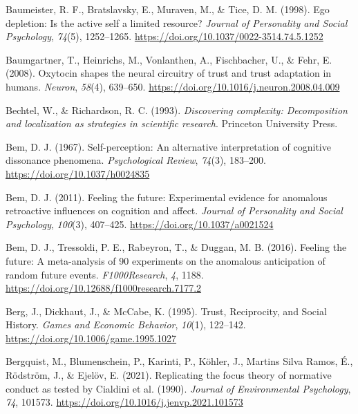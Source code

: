 \documentclass[
  letterpaper,
]{book}
\newlength{\cslhangindent}
\newenvironment{CSLReferences}[2] %
 {\begin{list}{}{%
  \setlength{\itemindent}{0pt}
  \setlength{\leftmargin}{0pt}
  \setlength{\parsep}{0pt}
  \ifodd #1
   \setlength{\leftmargin}{\cslhangindent}
   \setlength{\itemindent}{-1\cslhangindent}
  \fi
  \setlength{\itemsep}{#2\baselineskip}}}
 {\end{list}}
\begin{document}
\begin{CSLReferences}{1}{0}
Baumeister, R. F., Bratslavsky, E., Muraven, M., \& Tice, D. M. (1998).
Ego depletion: Is the active self a limited resource? \emph{Journal of
Personality and Social Psychology}, \emph{74}(5), 1252--1265.
\url{https://doi.org/10.1037/0022-3514.74.5.1252}

Baumgartner, T., Heinrichs, M., Vonlanthen, A., Fischbacher, U., \&
Fehr, E. (2008). Oxytocin shapes the neural circuitry of trust and trust
adaptation in humans. \emph{Neuron}, \emph{58}(4), 639--650.
\url{https://doi.org/10.1016/j.neuron.2008.04.009}

Bechtel, W., \& Richardson, R. C. (1993). \emph{Discovering complexity:
{Decomposition} and localization as strategies in scientific research}.
Princeton University Press.

Bem, D. J. (1967). Self-perception: {An} alternative interpretation of
cognitive dissonance phenomena. \emph{Psychological Review},
\emph{74}(3), 183--200. \url{https://doi.org/10.1037/h0024835}

Bem, D. J. (2011). Feeling the future: {Experimental} evidence for
anomalous retroactive influences on cognition and affect. \emph{Journal
of Personality and Social Psychology}, \emph{100}(3), 407--425.
\url{https://doi.org/10.1037/a0021524}

Bem, D. J., Tressoldi, P. E., Rabeyron, T., \& Duggan, M. B. (2016).
Feeling the future: A meta-analysis of 90 experiments on the anomalous
anticipation of random future events. \emph{F1000Research}, \emph{4},
1188. \url{https://doi.org/10.12688/f1000research.7177.2}

Berg, J., Dickhaut, J., \& McCabe, K. (1995). Trust, {Reciprocity}, and
{Social} {History}. \emph{Games and Economic Behavior}, \emph{10}(1),
122--142. \url{https://doi.org/10.1006/game.1995.1027}

Bergquist, M., Blumenschein, P., Karinti, P., Köhler, J., Martins Silva
Ramos, É., Rödström, J., \& Ejelöv, E. (2021). Replicating the focus
theory of normative conduct as tested by {Cialdini} et al. (1990).
\emph{Journal of Environmental Psychology}, \emph{74}, 101573.
\url{https://doi.org/10.1016/j.jenvp.2021.101573}


\end{CSLReferences}
\end{document}
